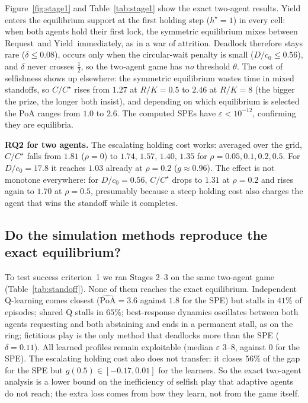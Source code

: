 \documentclass[10pt]{article}
\newcommand{\PoAhat}{\widehat{\mathrm{PoA}}}
\newcommand{\Req}{\textsf{Request}}
\newcommand{\Yield}{\textsf{Yield}}
\begin{document}
Figure~\ref{fig:stage1} and Table~\ref{tab:stage1} show the exact two-agent results. Yield enters the equilibrium support
at the first holding step ($h^\star=1$) in every cell: when both agents hold their first lock, the symmetric equilibrium
mixes between \Req\ and \Yield\ immediately, as in a war of attrition. Deadlock therefore stays rare ($\delta\le0.08$),
occurs only when the circular-wait penalty is small ($D/c_0\le0.56$), and $\delta$ never crosses $\tfrac12$, so the
two-agent game has \emph{no} threshold $\theta$. The cost of selfishness shows up elsewhere: the symmetric equilibrium
wastes time in mixed standoffs, so $C/C^\star$ rises from $1.27$ at $R/K=0.5$ to $2.46$ at $R/K=8$ (the bigger the prize, the
longer both insist), and depending on which equilibrium is selected the PoA ranges from $1.0$ to $2.6$. The computed SPEs
have $\varepsilon<10^{-12}$, confirming they are equilibria.

\textbf{RQ2 for two agents.} The escalating holding cost works: averaged over the grid, $C/C^\star$ falls from $1.81$
($\rho=0$) to $1.74,\,1.57,\,1.40,\,1.35$ for $\rho=0.05,0.1,0.2,0.5$. For $D/c_0=17.8$ it reaches $1.03$ already at
$\rho=0.2$ ($g\approx0.96$). The effect is not monotone everywhere: for $D/c_0=0.56$, $C/C^\star$ drops to $1.31$ at
$\rho=0.2$ and rises again to $1.70$ at $\rho=0.5$, presumably because a steep holding cost also charges the agent that wins the standoff while it
completes.

\subsection{Do the simulation methods reproduce the exact equilibrium?}
\begin{table}[t]
\centering\small
\caption{All methods on the two-agent standoff, the game solved exactly in Stage 1 ($\rho=0$, averaged over $R/K$,
$D$, $I$; Monte-Carlo estimates). $g(0.5)$: gap closed by the escalating holding cost at $\rho=0.5$.}
\label{tab:standoff}

\end{table}
To test success criterion~1 we ran Stages 2--3 on the same two-agent game (Table~\ref{tab:standoff}). None of them
reaches the exact equilibrium. Independent Q-learning comes closest ($\PoAhat=3.6$ against $1.8$ for the SPE) but
stalls in $41\%$ of episodes; shared Q stalls in $65\%$; best-response dynamics oscillates between both agents requesting
and both abstaining and ends in a permanent stall, as on the ring; fictitious play is the only method that deadlocks more
than the SPE ($\delta=0.11$). All learned profiles remain exploitable (median $\varepsilon$ $3$--$8$, against $0$ for
the SPE). The escalating holding cost also does not transfer: it closes $56\%$ of the gap for the SPE but
$g(0.5)\in[-0.17,0.01]$ for the learners. So the exact two-agent analysis is a lower bound on the inefficiency of selfish
play that adaptive agents do not reach; the extra loss comes from how they learn, not from the game itself.
\end{document}

